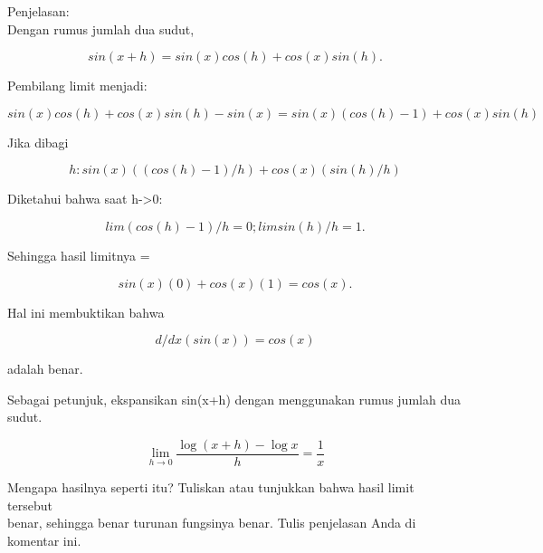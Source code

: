 \documentclass[a4paper,10pt]{article}
\begin{document}
\begin{eulernotebook}
\begin{eulercomment}
\begin{eulercomment}
\begin{eulercomment}
\begin{eulercomment}
\begin{eulercomment}
Penjelasan:\\
Dengan rumus jumlah dua sudut,\\
\end{eulercomment}
\begin{eulerformula}
\[
sin(x+h) = sin(x)cos(h) + cos(x)sin(h).
\]
\end{eulerformula}
\begin{eulercomment}
Pembilang limit menjadi:\\
\end{eulercomment}
\begin{eulerformula}
\[
sin(x)cos(h) + cos(x)sin(h) - sin(x)= sin(x)(cos(h)-1) + cos(x)sin(h)
\]
\end{eulerformula}
\begin{eulercomment}
Jika dibagi\\
\end{eulercomment}
\begin{eulerformula}
\[
h: sin(x)((cos(h)-1)/h) + cos(x)(sin(h)/h)
\]
\end{eulerformula}
\begin{eulercomment}
Diketahui bahwa saat h-\textgreater{}0:\\
\end{eulercomment}
\begin{eulerformula}
\[
lim (cos(h)-1)/h = 0 ; lim sin(h)/h = 1.
\]
\end{eulerformula}
\begin{eulercomment}
Sehingga hasil limitnya =\\
\end{eulercomment}
\begin{eulerformula}
\[
sin(x)(0) + cos(x)(1) = cos(x).
\]
\end{eulerformula}
\begin{eulercomment}
Hal ini membuktikan bahwa\\
\end{eulercomment}
\begin{eulerformula}
\[
d/dx (sin(x)) = cos(x)
\]
\end{eulerformula}
\begin{eulercomment}
adalah benar.


Sebagai petunjuk, ekspansikan sin(x+h) dengan menggunakan rumus jumlah
dua sudut.
\end{eulercomment}
\begin{eulerformula}
\[
\lim_{h\rightarrow 0}{\frac{\log \left(x+h\right)-\log x}{h}}=  \frac{1}{x}
\]
\end{eulerformula}
\begin{eulercomment}
Mengapa hasilnya seperti itu? Tuliskan atau tunjukkan bahwa hasil
limit tersebut\\
benar, sehingga benar turunan fungsinya benar.  Tulis penjelasan Anda
di komentar ini.



\end{eulercomment}
\end{eulercomment}
\end{eulercomment}
\end{eulercomment}
\end{eulercomment}
\end{eulernotebook}
\end{document}
